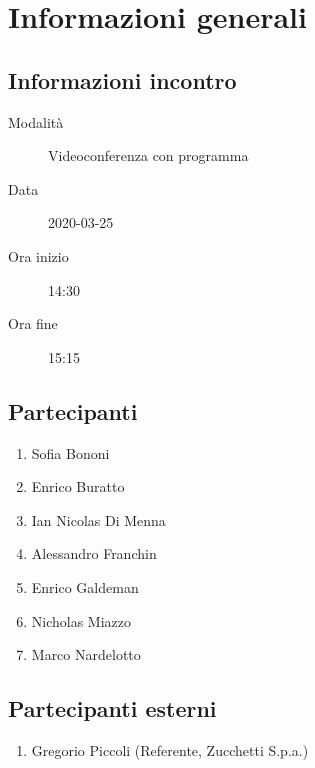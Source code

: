 \documentclass{article}
\begin{document}


\section{Informazioni generali}%
\label{sec:informazioni_generali}

\subsection{Informazioni incontro}%
\label{sub:informazioni_incontro}

\begin{description}
  \item[Modalità] Videoconferenza con programma 
  \item[Data] 2020-03-25
  \item[Ora inizio] 14:30
  \item[Ora fine] 15:15
\end{description}

\subsection{Partecipanti}%
\label{sub:partecipanti}

\begin{enumerate}
  \item Sofia Bononi
  \item Enrico Buratto
  \item Ian Nicolas Di Menna
  \item Alessandro Franchin
  \item Enrico Galdeman
  \item Nicholas Miazzo
  \item Marco Nardelotto
\end{enumerate}

\subsection{Partecipanti esterni}%
\label{sub:partecipanti esterni}

\begin{enumerate}
    \item Gregorio Piccoli (Referente, Zucchetti S.p.a.)
\end{enumerate}
\end{document}
